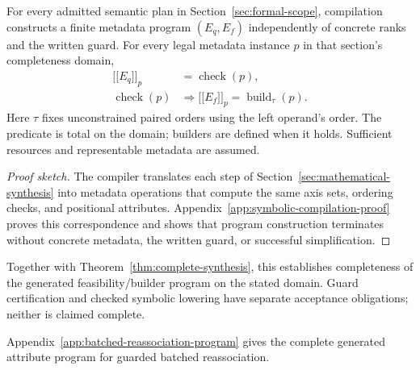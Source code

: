 \begin{theorem}
\label{thm:symbolic-compilation}
For every admitted semantic plan in Section~\ref{sec:formal-scope}, compilation
constructs a finite metadata program $(E_q,E_f)$ independently of concrete
ranks and the written guard. For every legal metadata instance $p$ in that
section's completeness domain,
\begin{align}
 \lbrack\!\lbrack E_q\rbrack\!\rbrack_p&=\operatorname{check}(p),
 \label{eq:emitted-check}\\
 \operatorname{check}(p)&\Rightarrow
 \lbrack\!\lbrack E_f\rbrack\!\rbrack_p=\operatorname{build}_{\tau}(p).
 \label{eq:emitted-build}
\end{align}
Here $\tau$ fixes unconstrained paired orders using the left operand's
order. The predicate is total on the domain; builders are defined when it
holds. Sufficient resources and representable metadata are assumed.
\end{theorem}
\begin{proof}[Proof sketch]
The compiler translates each step of Section~\ref{sec:mathematical-synthesis}
into metadata operations that compute the same axis sets, ordering checks,
and positional attributes. Appendix~\ref{app:symbolic-compilation-proof}
proves this correspondence and shows that program construction terminates
without concrete metadata, the written guard, or successful simplification.
\end{proof}
Together with Theorem~\ref{thm:complete-synthesis}, this establishes
completeness of the generated feasibility/builder program on the stated
domain. Guard certification and checked symbolic lowering have separate
acceptance obligations; neither is claimed complete.

Appendix~\ref{app:batched-reassociation-program} gives the complete generated
attribute program for guarded batched reassociation.

